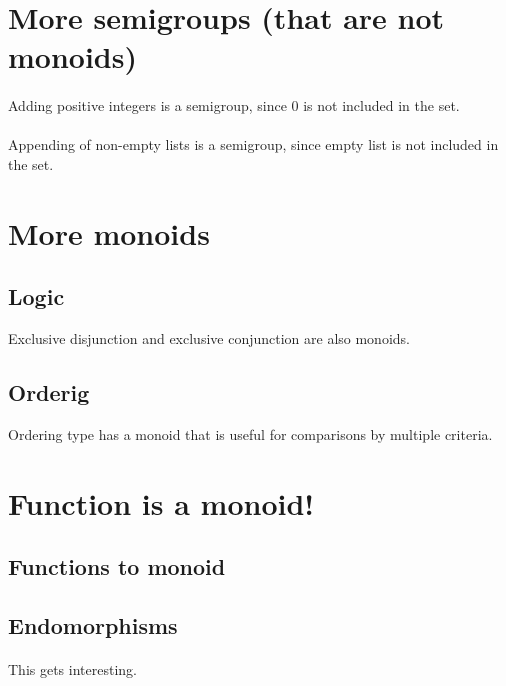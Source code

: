\documentclass{article}
\begin{document}
    \section{More semigroups (that are not monoids)}

    \paragraph{}
    Adding positive integers is a semigroup, since $0$ is not included in the set.

    \paragraph{}
    Appending of non-empty lists is a semigroup, since empty list is not included in the set.

    \section{More monoids}

    \subsection{Logic}

    Exclusive disjunction and exclusive conjunction are also monoids.

    \subsection{Orderig}

    Ordering type has a monoid that is useful for comparisons by multiple criteria.

    \newpage

    \section{Function is a monoid!}

    \subsection{Functions to monoid}

    \subsection{Endomorphisms}

    \paragraph{}
    This gets interesting. 
\end{document}
